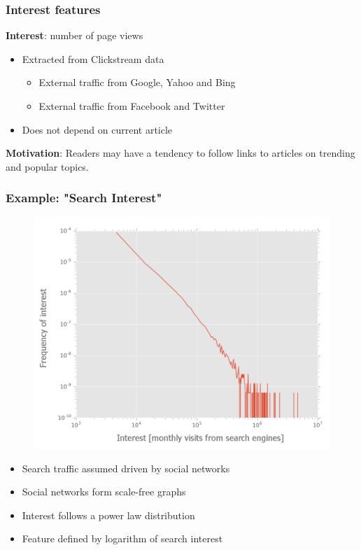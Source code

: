 \begin{frame}
   \frametitle{Interest features}
   \textbf{Interest}: number of page views

   \begin{itemize} 
   \item Extracted from Clickstream data
   
   \begin{itemize}
\item External traffic from Google, Yahoo and Bing
\item External traffic from Facebook and Twitter

\end{itemize}
\item Does not depend on current article
\end{itemize}
   \textbf{Motivation}: Readers may have a tendency to follow links to articles on trending and popular topics.
   
\end{frame}

\begin{frame}
   \frametitle{Example: "Search Interest"}
     \begin{figure}[h]
   \includegraphics[height=0.6\textheight]{images/pwl_graph}
  \end{figure}
   
   \begin{itemize}
\item Search traffic assumed driven by social networks
\item Social networks form scale-free graphs
\item Interest follows a power law distribution
\item Feature defined by logarithm of search interest
\end{itemize}
   
\end{frame}